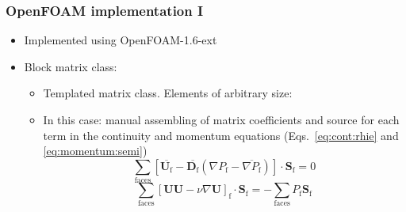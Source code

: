 \documentclass[9pt,handout]{beamer} %
\newcommand{\Ukrj}{\mathbf{U}}
\newcommand{\Sf}{\mathbf{S}_\mathrm{f}}
\newcommand{\Pp}{P}
\newcommand{\D}{\overline{\mathbf{D}_\mathrm{f}}}
\begin{document}
\begin{frame}%
\frametitle{OpenFOAM implementation I}
\begin{itemize}
    \item Implemented using OpenFOAM-1.6-ext 
    \pause
    \item Block matrix class: 
    \begin{itemize}
        \item Templated matrix class. Elements of arbitrary size:
        
        \pause
        \item In this case: manual assembling of matrix coefficients and source for each term in the continuity and momentum equations (Eqs.~\eqref{eq:cont:rhie} and \eqref{eq:momentum:semi})
\pause
\begin{equation*}
\label{eq:cont:rhie}
\displaystyle\sum_\mathrm{faces} \left[\overline{\Ukrj_\mathrm{f}}-\D\left(\nabla \Pp_\mathrm{f}-\overline{\nabla \Pp_\mathrm{f}}\right)\right]\cdot\Sf=0
\end{equation*}
\begin{equation*}
\label{eq:momentum:semi}
\displaystyle\sum_\mathrm{faces} \left[ \Ukrj \Ukrj- \nu\nabla\Ukrj \right]_\mathrm{f}\cdot\Sf=-\displaystyle\sum_\mathrm{faces} \Pp_\mathrm{f}\Sf
\end{equation*}     
    \end{itemize}
\end{itemize}
\end{frame}
\end{document}
